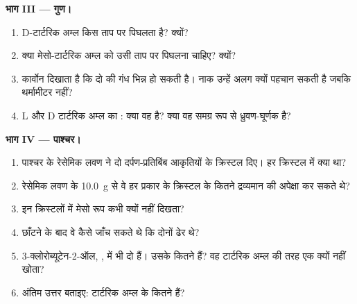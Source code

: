 \begin{problem}
\medskip
\noindent\textbf{भाग III --- गुण।}
\begin{enumerate}[resume]
  \item D-टार्टरिक अम्ल किस ताप पर पिघलता है? क्यों?
  \item क्या मेसो-टार्टरिक अम्ल को उसी ताप पर पिघलना चाहिए? क्यों?
  \item कार्वोन दिखाता है कि दो  की गंध भिन्न हो सकती है। नाक
        उन्हें अलग क्यों पहचान सकती है जबकि थर्मामीटर नहीं?
  \item L और D टार्टरिक अम्ल का : क्या वह  है? क्या वह समग्र रूप से ध्रुवण-घूर्णक है?
\end{enumerate}

\medskip
\noindent\textbf{भाग IV --- पाश्चर।}
\begin{enumerate}[resume]
  \item पाश्चर के रेसेमिक लवण ने दो दर्पण-प्रतिबिंब आकृतियों के क्रिस्टल दिए।
        हर क्रिस्टल में क्या था?
  \item रेसेमिक लवण के \qty{10.0}{g} से वे हर प्रकार के
        क्रिस्टल के कितने द्रव्यमान की अपेक्षा कर सकते थे?
  \item इन क्रिस्टलों में मेसो रूप कभी क्यों नहीं दिखता?
  \item छाँटने के बाद वे कैसे जाँच सकते थे कि दोनों ढेर
         थे?
  \item 3-क्लोरोब्यूटेन-2-ऑल, , में भी दो
         हैं। उसके कितने  हैं? वह
        टार्टरिक अम्ल की तरह एक क्यों नहीं खोता?
  \item अंतिम उत्तर बताइए: टार्टरिक अम्ल के कितने 
        हैं?
\end{enumerate}
\end{problem}
